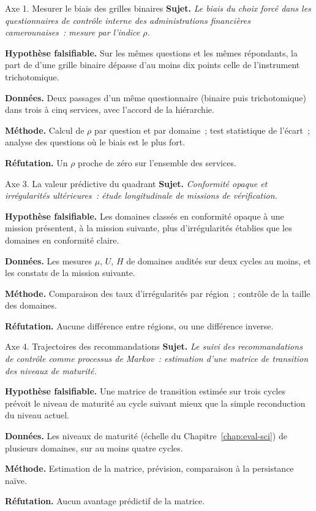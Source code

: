 \begin{boxscenario}{Axe 1. Mesurer le biais des grilles binaires}
\textbf{Sujet.} \emph{Le biais du choix forcé dans les questionnaires de
contrôle interne des administrations financières camerounaises~: mesure par
l'indice $\rho$.}

\textbf{Hypothèse falsifiable.} Sur les mêmes questions et les mêmes
répondants, la part de \OUI{} d'une grille binaire dépasse d'au moins dix
points celle de l'instrument trichotomique.

\textbf{Données.} Deux passages d'un même questionnaire (binaire puis
trichotomique) dans trois à cinq services, avec l'accord de la hiérarchie.

\textbf{Méthode.} Calcul de $\rho$ par question et par domaine~; test
statistique de l'écart~; analyse des questions où le biais est le plus fort.

\textbf{Réfutation.} Un $\rho$ proche de zéro sur l'ensemble des services.
\end{boxscenario}

\begin{boxscenario}{Axe 3. La valeur prédictive du quadrant}
\textbf{Sujet.} \emph{Conformité opaque et irrégularités ultérieures~: étude
longitudinale de missions de vérification.}

\textbf{Hypothèse falsifiable.} Les domaines classés en conformité opaque à
une mission présentent, à la mission suivante, plus d'irrégularités établies
que les domaines en conformité claire.

\textbf{Données.} Les mesures $\mu$, $U$, $H$ de domaines audités sur deux
cycles au moins, et les constats de la mission suivante.

\textbf{Méthode.} Comparaison des taux d'irrégularités par région~; contrôle
de la taille des domaines.

\textbf{Réfutation.} Aucune différence entre régions, ou une différence
inverse.
\end{boxscenario}

\begin{boxscenario}{Axe 4. Trajectoires des recommandations}
\textbf{Sujet.} \emph{Le suivi des recommandations de contrôle comme
processus de Markov~: estimation d'une matrice de transition des niveaux de
maturité.}

\textbf{Hypothèse falsifiable.} Une matrice de transition estimée sur trois
cycles prévoit le niveau de maturité au cycle suivant mieux que la simple
reconduction du niveau actuel.

\textbf{Données.} Les niveaux de maturité (échelle du
Chapitre~\ref{chap:eval-sci}) de plusieurs domaines, sur au moins quatre
cycles.

\textbf{Méthode.} Estimation de la matrice, prévision, comparaison à la
persistance naïve.

\textbf{Réfutation.} Aucun avantage prédictif de la matrice.
\end{boxscenario}

